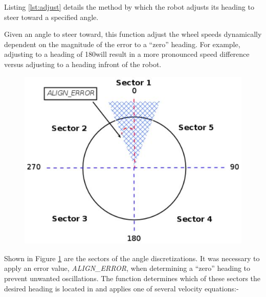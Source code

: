Listing \ref{lst:adjust} details the method by which the robot adjusts its heading to steer toward a specified angle.

Given an angle to steer toward, this function adjust the wheel speeds dynamically dependent on the magnitude of the error to a ``zero'' heading. For example, adjusting to a heading of 180\textdegree will result in a more pronounced speed difference versus adjusting to a heading infront of the robot.

\begin{figure}[h]
	\centering
	\begin{minipage}{.75\textwidth}
		\centering
		\includegraphics[width=1\linewidth]{sections_robot}
		\label{fig:robot-sectors}
	\end{minipage}
\end{figure}

Shown in Figure \ref{fig:robot-sectors} are the sectors of the angle discretizations. It was necessary to apply an error value, \textit{ALIGN\_ERROR}, when determining a ``zero'' heading to prevent unwanted oscillations. The function determines which of these sectors the desired heading is located in and applies one of several velocity equations:-

